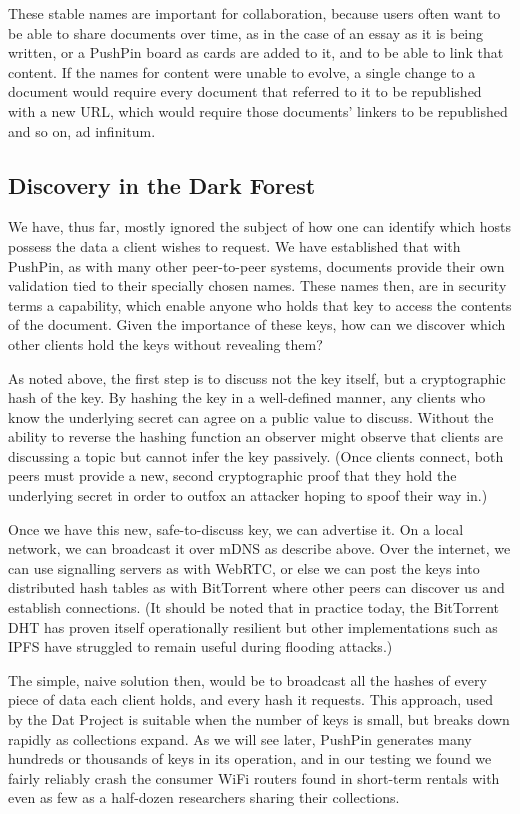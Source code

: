 \documentclass[sigplan,10pt]{acmart}
\begin{document}
These stable names are important for collaboration, because users often want to be able to share documents over time, as in the case of an essay as it is being written, or a PushPin board as cards are added to it, and to be able to link that content. If the names for content were unable to evolve, a single change to a document would require every document that referred to it to be republished with a new URL, which would require those documents' linkers to be republished and so on, ad infinitum. 

\subsection{Discovery in the Dark Forest}

We have, thus far, mostly ignored the subject of how one can identify which hosts possess the data a client wishes to request. We have established that with PushPin, as with many other peer-to-peer systems, documents provide their own validation tied to their specially chosen names. These names then, are in security terms a capability, which enable anyone who holds that key to access the contents of the document. Given the importance of these keys, how can we discover which other clients hold the keys without revealing them?

As noted above, the first step is to discuss not the key itself, but a cryptographic hash of the key. By hashing the key in a well-defined manner, any clients who know the underlying secret can agree on a public value to discuss. Without the ability to reverse the hashing function an observer might observe that clients are discussing a topic but cannot infer the key passively. (Once clients connect, both peers must provide a new, second cryptographic proof that they hold the underlying secret in order to outfox an attacker hoping to spoof their way in.)

Once we have this new, safe-to-discuss key, we can advertise it. On a local network, we can broadcast it over mDNS as describe above. Over the internet, we can use signalling servers as with WebRTC, or else we can post the keys into distributed hash tables as with BitTorrent where other peers can discover us and establish connections. (It should be noted that in practice today, the BitTorrent DHT has proven itself operationally resilient but other implementations such as IPFS have struggled to remain useful during flooding attacks.)

The simple, naive solution then, would be to broadcast all the hashes of every piece of data each client holds, and every hash it requests. This approach, used by the Dat Project \cite{DatProject} is suitable when the number of keys is small, but breaks down rapidly as collections expand. As we will see later, PushPin generates many hundreds or thousands of keys in its operation, and in our testing we found we fairly reliably crash the consumer WiFi routers found in short-term rentals with even as few as a half-dozen researchers sharing their collections.
\end{document}
